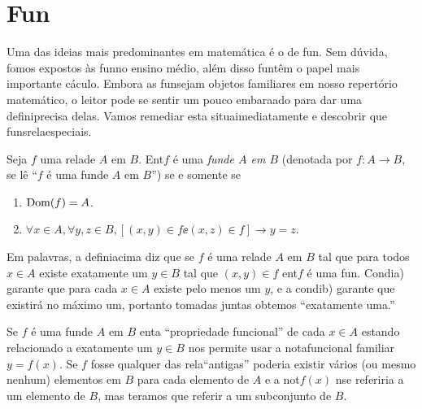 \section{Fun\cois}\label{funcoes}

Uma das ideias mais predominantes em matem\'atica \'e o de fun\caoi. Sem d\'uvida, fomos expostos \`as fun\coes no ensino m\'edio, al\'em disso fun\coes t\^em o papel mais importante c\'aculo. Embora as fun\coes sejam objetos familiares em nosso repert\'orio matem\'atico, o leitor pode se sentir um pouco embara\cc ado para dar uma defini\cao precisa delas. Vamos remediar esta situa\cao imediatamente e descobrir que fun\coes s\ao rela\coes especiais.
\begin{definb}
Seja $f$ uma rela\cao de $A$ em $B$. Ent\ao $f$ \'e uma {\it fun\cao de $A$ em $B$} (denotada por $f:A\to B$, se l\^e ``$f$ \'e uma fun\cao de $A$ em $B$'') se e somente se
\begin{enumerate}[{\bf a)}]
\item $\operatorname{Dom}(f)=A$.
\item $\forall x\in A, \forall y,z\in B, [(x,y)\in f\ee (x,z)\in f]\to y=z$.
\end{enumerate}
\end{definb}

Em palavras, a defini\cao acima diz que se $f$ \'e uma rela\cao de $A$ em $B$ tal que para todos $x\in A$ existe exatamente um $y\in B$ tal que $(x,y)\in f$ ent\ao $f$ \'e uma fun\caoi. Condi\cao a) garante que para cada $x\in A$ existe pelo menos um $y$, e a condi\cao b) garante que existir\'a no m\'aximo um, portanto tomadas juntas obtemos ``exatamente uma.''

Se $f$ \'e uma fun\cao de $A$ em $B$ ent\ao a ``propriedade funcional'' de cada $x\in A$ estando relacionado a exatamente um $y\in B$ nos permite usar a nota\cao funcional familiar $y=f(x)$. Se $f$ fosse qualquer das rela\coes ``antigas'' poderia existir v\'arios (ou mesmo nenhum) elementos em $B$ para cada elemento de $A$ e a not\cao $f(x)$ n\ao se referiria a um elemento de $B$, mas ter\ih amos que referir a um subconjunto de $B$.

